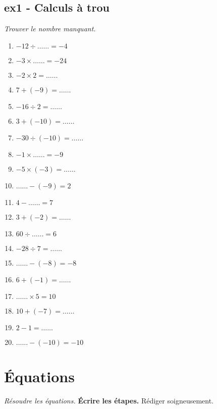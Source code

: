 \documentclass[12pt]{article}
\begin{document}
\subsection*{ex1 - Calculs  à trou}
\textit{Trouver le nombre manquant.}

  \begin{multicols}{3}\noindent
    \begin{enumerate}
    \item $-12 \div \ldots\ldots = -4$
    \item $-3 \times \ldots\ldots = -24$
    \item $-2 \times 2 = \ldots\ldots$
    \item $7 + \left( -9\right) = \ldots\ldots$
    \item $-16 \div 2 = \ldots\ldots$
    \item $3 + \left( -10\right) = \ldots\ldots$
    \item $-30 \div \left( -10\right) = \ldots\ldots$
    \item $-1 \times \ldots\ldots = -9$
    \item $-5 \times \left( -3\right) = \ldots\ldots$
    \item $\ldots\ldots - \left( -9\right) = 2$
    \item $4 - \ldots\ldots = 7$
    \item $3 + \left( -2\right) = \ldots\ldots$
    \item $60 \div \ldots\ldots = 6$
    \item $-28 \div 7 = \ldots\ldots$
    \item $\ldots\ldots - \left( -8\right) = -8$
    \item $6 + \left( -1\right) = \ldots\ldots$
    \item $\ldots\ldots \times 5 = 10$
    \item $10 + \left( -7\right) = \ldots\ldots$
    \item $2 - 1 = \ldots\ldots$
    \item $\ldots\ldots - \left( -10\right) = -10$
    \end{enumerate}
  \end{multicols}


    \section*{Équations}
  \textit{Résoudre les équations.} \textbf{Écrire les étapes.} Rédiger soigneusement.
\end{document}
